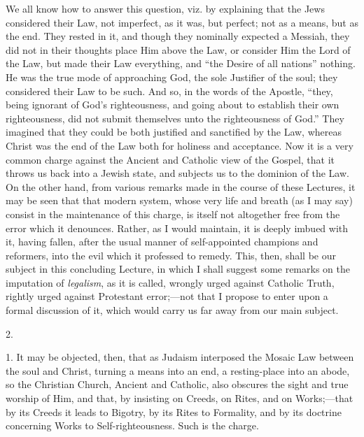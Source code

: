 We all know how to answer this question, viz. by explaining that
the Jews considered their Law, not imperfect, as it was, but perfect;
not as a means, but as the end. They rested in it, and though they
nominally expected a Messiah, they did not in their thoughts place Him
above the Law, or consider Him the Lord of the Law, but made their Law
everything, and ``the Desire of all nations'' nothing. He was
the true mode of approaching God, the sole Justifier of the soul; they
considered their Law to be such. And so, in the words of the
Apostle, ``they, being ignorant of God's righteousness, and going
about to establish their own righteousness, did not submit themselves
unto the righteousness of God.'' They imagined that they could be
both justified and sanctified by the Law, whereas Christ was the end
of the Law both for holiness and acceptance. Now it is a very common
charge against the Ancient and Catholic view of the Gospel, that it
throws us back into a Jewish state, and subjects us to the dominion of
the Law. On the other hand, from various remarks made in the course of
these Lectures, it may be seen that that modern system, whose very
life and breath (as I may say) consist in the maintenance of this
charge, is itself not altogether free from the error which it
denounces. Rather, as I would maintain, it is deeply imbued with it,
having fallen, after the usual manner of self-appointed champions and
reformers, into the evil which it professed to remedy. This, then,
shall be our subject in this concluding Lecture, in which I shall
suggest some remarks on the imputation of \emph{legalism}, as it is
called, wrongly urged against Catholic Truth, rightly urged against
Protestant error;—not that I propose to enter upon a formal
discussion of it, which would carry us far away from our main subject.

2.

1. It may be objected, then, that as Judaism interposed the Mosaic
Law between the soul and Christ, turning a means into an end, a
resting-place into an abode, so the Christian Church, Ancient and
Catholic, also obscures the sight and true worship of Him, and that, by insisting on Creeds, on Rites, and on Works;—that by its
Creeds it leads to Bigotry, by its Rites to Formality, and by its
doctrine concerning Works to Self-righteousness. Such is the charge.

